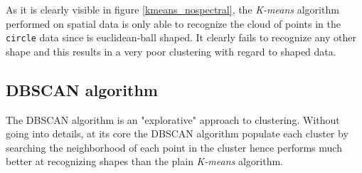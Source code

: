   As it is clearly visible in figure \ref{kmeans_nospectral}, the \textit{K-means} algorithm performed on spatial data is only able to recognize the cloud of points in the \texttt{circle} data since is euclidean-ball shaped. It clearly fails to recognize any other shape and this results in a very poor clustering with regard to shaped data.

  \subsection{DBSCAN algorithm}
  The DBSCAN algorithm is an "explorative" approach to clustering. Without going into details, at its core the DBSCAN algorithm populate each cluster by searching the neighborhood of each point in the cluster hence performs much better at recognizing shapes than the plain \textit{K-means} algorithm.

